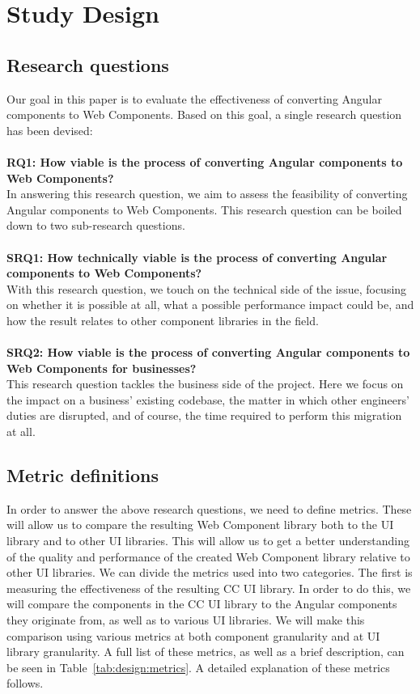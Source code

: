 \chapter{Study Design}\label{chap:design}

\section{Research questions}
Our goal in this paper is to evaluate the effectiveness of converting Angular components to Web Components. Based on this goal, a single research question has been devised:
\\
\\
\textbf{RQ1: How viable is the process of converting Angular components to Web Components?}
\\
In answering this research question, we aim to assess the feasibility of converting Angular components to Web Components. This research question can be boiled down to two sub-research questions.
\\
\\
\textbf{SRQ1: How technically viable is the process of converting Angular components to Web Components?}
\\
With this research question, we touch on the technical side of the issue, focusing on whether it is possible at all, what a possible performance impact could be, and how the result relates to other component libraries in the field.
\\
\\
\textbf{SRQ2: How viable is the process of converting Angular components to Web Components for businesses?}
\\
This research question tackles the business side of the project. Here we focus on the impact on a business' existing codebase, the matter in which other engineers' duties are disrupted, and of course, the time required to perform this migration at all.


\section{Metric definitions}
In order to answer the above research questions, we need to define metrics. These will allow us to compare the resulting Web Component library both to the UI library and to other UI libraries. This will allow us to get a better understanding of the quality and performance of the created Web Component library relative to other UI libraries. We can divide the metrics used into two categories. The first is measuring the effectiveness of the resulting CC UI library. In order to do this, we will compare the components in the CC UI library to the Angular components they originate from, as well as to various UI libraries. We will make this comparison using various metrics at both component granularity and at UI library granularity. A full list of these metrics, as well as a brief description, can be seen in Table~\ref{tab:design:metrics}. A detailed explanation of these metrics follows.


